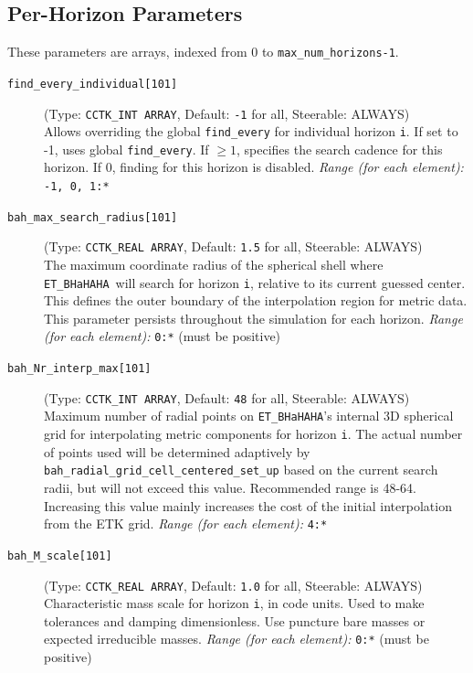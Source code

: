 \documentclass[a4paper,11pt]{article}
\newcommand{\thorn}[1]{{\tt #1}}
\newcommand{\BHaHAHA}{\thorn{ET\_BHaHAHA}} %
\begin{document}
\subsection{Per-Horizon Parameters}
\label{ssec:params_perhorizon}
These parameters are arrays, indexed from 0 to \texttt{max\_num\_horizons-1}.
\begin{description}
    \item[\texttt{find\_every\_individual[101]}] (Type: \texttt{CCTK\_INT ARRAY}, Default: \texttt{-1} for all, Steerable: ALWAYS) \\
        Allows overriding the global \texttt{find\_every} for individual horizon \texttt{i}. If set to -1, uses global \texttt{find\_every}. If $\ge 1$, specifies the search cadence for this horizon. If 0, finding for this horizon is disabled.
        \textit{Range (for each element):} \texttt{-1, 0, 1:*}

    \item[\texttt{bah\_max\_search\_radius[101]}] (Type: \texttt{CCTK\_REAL ARRAY}, Default: \texttt{1.5} for all, Steerable: ALWAYS) \\
        The maximum coordinate radius of the spherical shell where \BHaHAHA\ will search for horizon \texttt{i}, relative to its current guessed center. This defines the outer boundary of the interpolation region for metric data. This parameter persists throughout the simulation for each horizon.
        \textit{Range (for each element):} \texttt{0:*} (must be positive)

    \item[\texttt{bah\_Nr\_interp\_max[101]}] (Type: \texttt{CCTK\_INT ARRAY}, Default: \texttt{48} for all, Steerable: ALWAYS) \\
        Maximum number of radial points on \BHaHAHA's internal 3D spherical grid for interpolating metric components for horizon \texttt{i}. The actual number of points used will be determined adaptively by \texttt{bah\_radial\_grid\_cell\_centered\_set\_up} based on the current search radii, but will not exceed this value. Recommended range is 48-64. Increasing this value mainly increases the cost of the initial interpolation from the ETK grid.
        \textit{Range (for each element):} \texttt{4:*}

    \item[\texttt{bah\_M\_scale[101]}] (Type: \texttt{CCTK\_REAL ARRAY}, Default: \texttt{1.0} for all, Steerable: ALWAYS) \\
        Characteristic mass scale for horizon \texttt{i}, in code units. Used to make tolerances and damping dimensionless. Use puncture bare masses or expected irreducible masses.
        \textit{Range (for each element):} \texttt{0:*} (must be positive)


\end{description}
\end{document}
